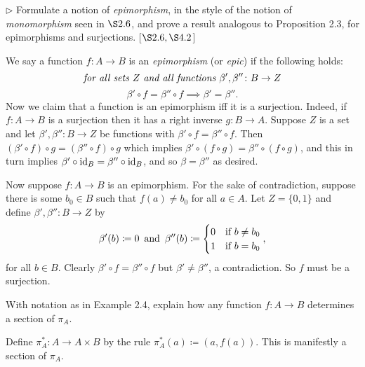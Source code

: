 \begin{exercise}
	\(\triangleright\) Formulate a notion of \textit{epimorphism}, in the style of the notion of \textit{monomorphism} seen in \(\S 2.6\), and prove a result analogous to Proposition 2.3, for epimorphisms and surjections. [\(\S 2.6, \S 4.2\)]
\end{exercise}
\begin{solution}
	We say a function $f\colon A \to B$ is an \emph{epimorphism} (or \emph{epic}) if the following holds:
	\[
		\textnormal{\textit{for all sets $Z$ and all functions $\beta',\beta''\colon B \to Z$}}
	\]
	\[
		\beta'\circ f = \beta'' \circ f \implies \beta' = \beta''.
	\]
	Now we claim that a function is an epimorphism iff it is a surjection. Indeed, if $f\colon A \to B$ is a surjection then it has a right inverse $g\colon B \to A$. Suppose $Z$ is a set and let $\beta', \beta''\colon B \to Z$ be functions with $\beta' \circ f = \beta'' \circ f$. Then $(\beta' \circ f)\circ g = (\beta'' \circ f)\circ g$ which implies $\beta' \circ (f\circ g) = \beta'' \circ (f\circ g)$, and this in turn implies $\beta' \circ \operatorname{id}_B = \beta'' \circ \operatorname{id}_B$, and so $\beta = \beta''$ as desired.
	
	Now suppose $f\colon A \to B$ is an epimorphism. For the sake of contradiction, suppose there is some $b_0\in B$ such that $f(a) \neq b_0$ for all $a\in A$. Let $Z = \{0,1\}$ and define $\beta',\beta''\colon B \to Z$ by
	\[
		\beta'(b) \coloneqq 0 \,\textnormal{ and } \,\beta''(b)\coloneqq \begin{cases}
			0 & \textnormal{if } b\neq b_0\\
			1 & \textnormal{if } b = b_0
		\end{cases},
	\]
	for all $b\in B$. Clearly $\beta'\circ f = \beta'' \circ f$ but $\beta' \neq \beta''$, a contradiction. So $f$ must be a surjection.
\end{solution}

\begin{exercise}
	With notation as in Example 2.4, explain how any function \(f \colon A \to B\) determines a section of \(\pi_A\).
\end{exercise}
\begin{solution}
	Define $\pi_A^*\colon A \to A \times B$ by the rule $\pi_A^*(a) \coloneqq (a, f(a))$. This is manifestly a section of $\pi_A$.
\end{solution}


